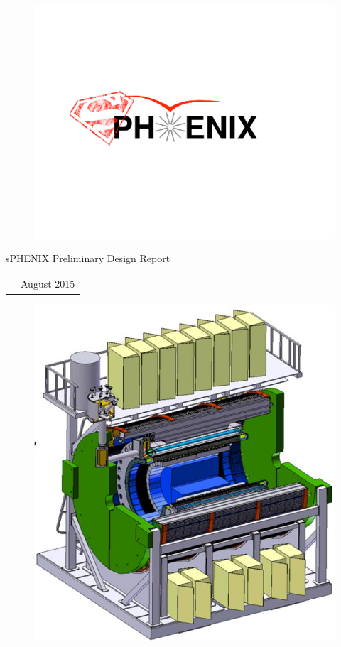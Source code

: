 \renewcommand*\familydefault{\sfdefault}
{\sffamily
\vfill
\vspace{4cm}
\begin{figure}[H]
  \begin{center}
  \includegraphics[width=0.6\linewidth]{figs/sPHENIX}
  \end{center}
\end{figure}

\begin{center}
  \large
  {\LARGE{sPHENIX Preliminary Design Report}}

  \begin{tabular}{rl}
  &August 2015 \\
  \end{tabular}
\end{center}

\vspace{2cm}

\begin{figure}[H]
  \begin{center}
    \includegraphics[width=0.7\linewidth]{figs/sPHENIX_Detector.jpg}
  \end{center}
\end{figure}
}


\vfill
\renewcommand*\familydefault{\rmdefault}